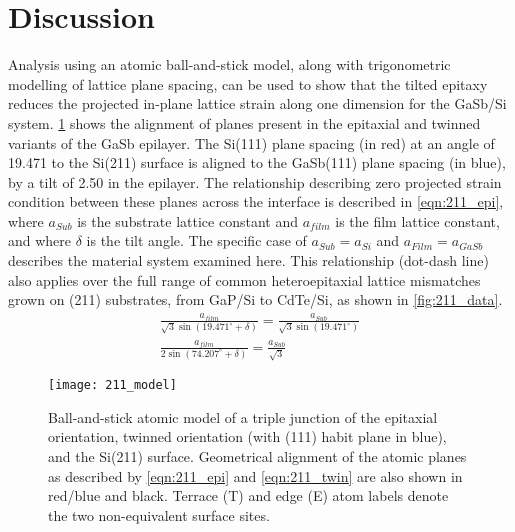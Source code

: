 \section{Discussion}
Analysis using an atomic ball-and-stick model, along with trigonometric modelling of lattice plane spacing, can be used to show that the tilted epitaxy reduces the projected in-plane lattice strain along one dimension for the GaSb/Si system.
\cref{fig:211_model} shows the alignment of planes present in the epitaxial and twinned variants of the GaSb epilayer.
The Si(111) plane spacing (in red) at an angle of 19.471\degree{} to the Si(211) surface is aligned to the GaSb(111) plane spacing (in blue), by a tilt of 2.50\degree{} in the epilayer.
The relationship describing zero projected strain condition between these planes across the interface is described in \cref{eqn:211_epi}, where \(a_{Sub}\) is the substrate lattice constant and \(a_{film}\) is the film lattice constant, and where \(\delta\) is the tilt angle. The specific case of \(a_{Sub} = a_{Si}\) and \(a_{Film} = a_{GaSb}\) describes the material system examined here.
This relationship (dot-dash line) also applies over the full range of common heteroepitaxial lattice mismatches grown on (211) substrates, from GaP/Si to CdTe/Si, as shown in \cref{fig:211_data}.
\begin{gather}
 \frac{a_{film}}{\sqrt{3} \sin(19.471^\circ + \delta)} = \frac{a_{Sub}}{\sqrt{3}\sin(19.471^\circ)} \label{eqn:211_epi}\\
 \frac{ a_{film}}{2\sin(74.207^\circ + \delta)} = \frac{a_{Sub}}{\sqrt{3}} \label{eqn:211_twin}
\end{gather}

\begin{figure}
 \centering \texttt{[image: 211\_model]}
 \caption[Atomic model of tilted thin film on 211 silicon]{\label{fig:211_model}Ball-and-stick atomic model of a triple junction of the epitaxial orientation, twinned orientation (with (111) habit plane in blue), and the Si(211) surface.
  Geometrical alignment of the atomic planes as described by \cref{eqn:211_epi} and \cref{eqn:211_twin} are also shown in red/blue and black.
  Terrace (T) and edge (E) atom labels denote the two non-equivalent surface sites.}
\end{figure}

